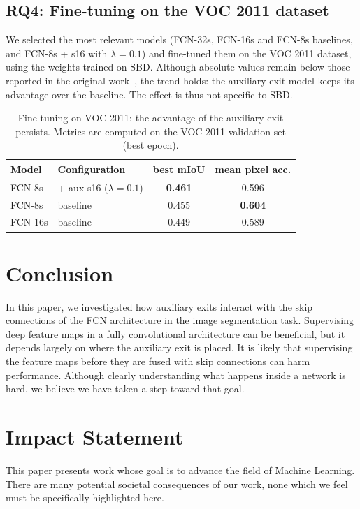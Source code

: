 \documentclass{article}
\begin{document}
    \subsection{RQ4: Fine-tuning on the VOC 2011 dataset}
    We selected the most relevant models (FCN-32s, FCN-16s and FCN-8s baselines,
    and FCN-8s + s16 with $\lambda=0.1$) and fine-tuned them on the VOC 2011 dataset, using the weights trained on SBD. Although absolute values remain below those reported in the original work~\cite{ref_fcn}, the trend holds: the auxiliary-exit model keeps its advantage over the baseline. The effect is thus not specific to SBD.
    
    \begin{table}[t]
\caption{Fine-tuning on VOC 2011: the advantage of the auxiliary exit persists.
Metrics are computed on the VOC 2011 validation set (best epoch).}
\label{tab:voc}
\vskip 0.15in
\begin{center}
\begin{small}
\begin{tabular}{llcc}
\toprule
Model & Configuration & best mIoU & mean pixel acc. \\
\midrule
FCN-8s  & + aux s16 ($\lambda{=}0.1$) & \textbf{0.461} & 0.596 \\
FCN-8s  & baseline                    & 0.455 & \textbf{0.604} \\
FCN-16s & baseline                    & 0.449 & 0.589 \\
\bottomrule
\end{tabular}
\end{small}
\end{center}
\vskip -0.1in
\end{table}




\section{Conclusion}
In this paper, we investigated how auxiliary exits interact with the skip connections of the FCN architecture in the image segmentation task.
Supervising deep feature maps in a fully convolutional architecture can be beneficial, but it depends largely on where the auxiliary exit is placed. It is likely that supervising the feature maps before they are fused with skip connections can harm performance.
Although clearly understanding what happens inside a network is hard, we believe we have taken a step toward that goal.

\section*{Impact Statement}
This paper presents work whose goal is to advance the field of Machine Learning.
There are many potential societal consequences of our work, none which we feel
must be specifically highlighted here.



\end{document}
